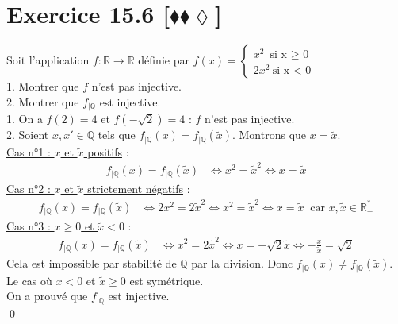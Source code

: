 \documentclass[10pt]{article}
\begin{document}
\section*{Exercice 15.6 [$\blacklozenge\blacklozenge\lozenge$]}
\begin{tcolorbox}[enhanced, width=7.6in, center, size=fbox, fontupper=\large, drop shadow southwest]
    Soit l'application $f:\mathbb{R} \to \mathbb{R}$ définie par $f(x)=\begin{cases}x^2 ~ \text{si x $\geq$ 0} \\ 2x^2 ~ \text{si x < 0}\end{cases}$\\
    1. Montrer que $f$ n'est pas injective.\\
    2. Montrer que $f_{|\mathbb{Q}}$ est injective.\\[0.2cm]
    1. On a $f(2) = 4$ et $f(-\sqrt{2}) = 4$ : $f$ n'est pas injective.\\
    2. Soient $x,x'\in\mathbb{Q}$ tels que $f_{|\mathbb{Q}}(x)=f_{|\mathbb{Q}}(\widetilde{x})$. Montrons que $x=\widetilde{x}$.\\
    \underline{Cas n°1 : $x$ et $\widetilde{x}$ positifs} :
    \begin{align*}
        f_{|\mathbb{Q}}(x) = f_{|\mathbb{Q}}(\widetilde{x}) &\iff x^2 = \widetilde{x}^2 \iff x = \widetilde{x}
    \end{align*}
    \underline{Cas n°2 : $x$ et $\widetilde{x}$ strictement négatifs} :
    \begin{align*}
        f_{|\mathbb{Q}}(x) = f_{|\mathbb{Q}}(\widetilde{x}) &\iff 2x^2 = 2\widetilde{x}^2 \iff x^2 = \widetilde{x}^2 \iff x = \widetilde{x} ~ \text{ car $x,\widetilde{x}\in\mathbb{R}^*_-$}
    \end{align*}
    \underline{Cas n°3 : $x\geq0$ et $\widetilde{x}<0$} :
    \begin{align*}
        f_{|\mathbb{Q}}(x) = f_{|\mathbb{Q}}(\widetilde{x}) &\iff x^2 = 2\widetilde{x}^2 \iff x = -\sqrt{2}\widetilde{x} \iff -\frac{x}{\widetilde{x}}=\sqrt{2}
    \end{align*}
    Cela est impossible par stabilité de $\mathbb{Q}$ par la division. Donc $f_{|\mathbb{Q}}(x) \neq f_{|\mathbb{Q}}(\widetilde{x})$.\\
    Le cas où $x < 0$ et $\widetilde{x}\geq0$ est symétrique.\\
    On a prouvé que $f_{|\mathbb{Q}}$ est injective.\\
    \qed
\end{tcolorbox}
\end{document}
